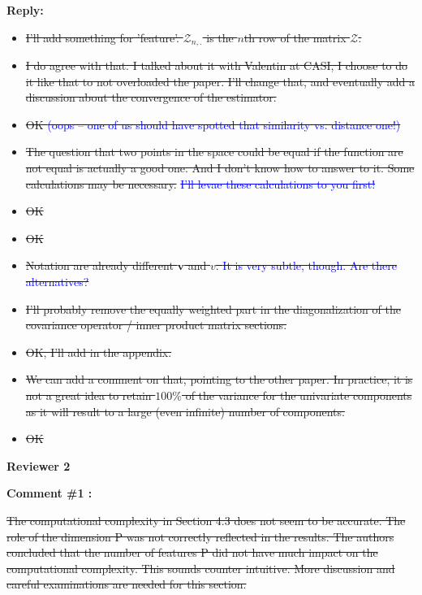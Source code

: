 \documentclass[11pt]{article}
\begin{document}
\medskip

\normalfont

\textbf{Reply:}

\begin{itemize}
  \item \sout{I'll add something for 'feature'. $\mathcal{Z}_{n,.}$ is the $n$th row of the matrix $\mathcal{Z}$.}
  \item \sout{I do agree with that. I talked about it with Valentin at CASI, I choose to do it like that to not overloaded the paper. I'll change that, and eventually add a discussion about the convergence of the estimator.}
  \item \sout{OK \textcolor{blue}{(oops – one of us should have spotted that similarity vs. distance one!)}}
  \item \sout{The question that two points in the space could be equal if the function are not equal is actually a good one. And I don't know how to answer to it. Some calculations may be necessary.} \textcolor{blue}{\sout{I’ll levae these calculations to you first!}}
  \item \sout{OK}
  \item \sout{OK}
  \item \sout{Notation are already different $\boldsymbol{v}$ and $v$. \textcolor{blue}{It is very subtle, though. Are there alternatives?}}
  \item \sout{I'll probably remove the equally weighted part in the diagonalization of the covariance operator / inner product matrix sections.}
  \item \sout{OK, I'll add in the appendix.}
  \item \sout{We can add a comment on that, pointing to the other paper. In practice, it is not a great idea to retain $100\%$ of the variance for the univariate components as it will result to a large (even infinite) number of components.}
  \item \sout{OK}  
\end{itemize}

\vspace*{1cm}


{\large \textbf{Reviewer 2} }


\bigskip

\itshape


\textbf{Comment \#1 :}

\sout{The computational complexity in Section 4.3 does not seem to be accurate. The role of the dimension P was not correctly reflected in the results. The authors concluded that the number of features P did not have much impact on the computational complexity. This sounds counter intuitive. More discussion and careful examinations are needed for this section.}
\end{document}
